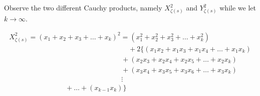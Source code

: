 \documentclass{amsart}
\begin{document}
	Observe the two different Cauchy products, namely $X_{\zeta(s)}^2$ and $Y_{\zeta(s)}^2$ while we let $k \to \infty$.
	
	
	\[ \begin{array}{c}
		X_{\zeta(s)}^2 = (x_1 + x_2 + x_3 + \dots + x_k)^2 = (x_1^2 + x_2^2 + x_3^2 + \dots + x_k^2) \\
		\qquad\qquad\qquad\qquad\qquad\qquad\qquad\qquad\quad + 2\{(x_1x_2 + x_1x_3 + x_1x_4 + \dots + x_{1}x_{k}) \\ 
		\qquad\qquad\qquad\qquad\qquad\qquad\qquad\qquad + (x_2x_3 + x_2x_4 + x_2x_5 + \dots + x_2x_{k}) \\ 
		\qquad\qquad\qquad\qquad\qquad\qquad\qquad\qquad + (x_3x_4 + x_3x_5 + x_3x_6 + \dots + x_3x_{k}) \\ 
		\qquad\qquad\qquad\qquad\qquad\qquad\qquad\qquad \vdots \\
		\qquad\qquad\qquad\qquad + \dots + (x_{k-1}x_{k}) \} \\ 
	\end{array} \]
	\[\]
	
\end{document}
